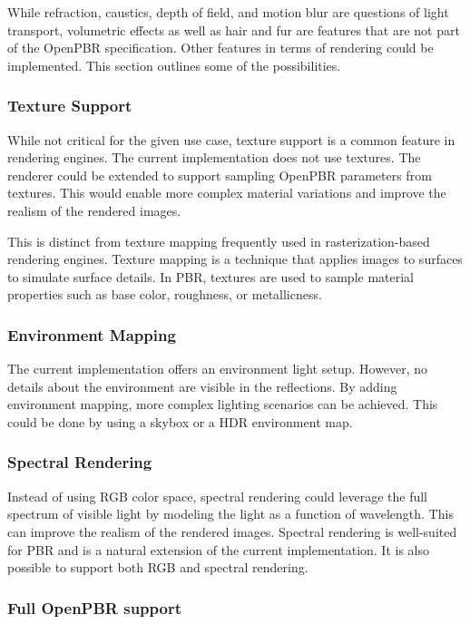 While refraction, caustics, depth of field, and motion blur are questions of light transport, volumetric effects as well as hair and fur are features that are not part of the \gls{OpenPBR} specification. Other features in terms of rendering could be implemented. This section outlines some of the possibilities.

\subsubsection*{Texture Support}

While not critical for the given use case, texture support is a common feature in rendering engines. The current implementation does not use textures. The renderer could be extended to support sampling \gls{OpenPBR} parameters from textures. This would enable more complex material variations and improve the realism of the rendered images.

This is distinct from texture mapping frequently used in rasterization-based rendering engines. Texture mapping is a technique that applies images to surfaces to simulate surface details. In \gls{PBR}, textures are used to sample material properties such as base color, roughness, or metallicness.

\subsubsection*{Environment Mapping}

The current implementation offers an environment light setup. However, no details about the environment are visible in the reflections. By adding environment mapping, more complex lighting scenarios can be achieved. This could be done by using a skybox or a \gls{HDR} environment map.

\subsubsection*{Spectral Rendering}

Instead of using \gls{RGB} color space, spectral rendering could leverage the full spectrum of visible light by modeling the light as a function of wavelength. This can improve the realism of the rendered images. Spectral rendering is well-suited for \gls{PBR} and is a natural extension of the current implementation. It is also possible to support both \gls{RGB} and spectral rendering.

\subsubsection*{Full OpenPBR support}

